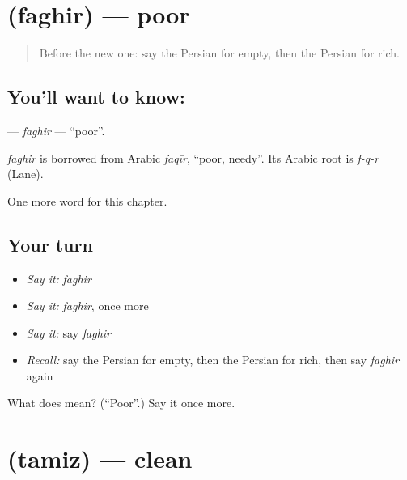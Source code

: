 \section[\texorpdfstring{\fa{فقیر} (faghir)}{فقیر (faghir)}]{ (faghir) — poor}

\label{lesson:FA-C61-faghir}



\begin{quote}
Before the new one: say the Persian for empty, then the Persian for rich.
\end{quote}

\subsection*{You'll want to know: }
\textbf{} — \emph{faghir} — \textquotedblleft{}poor\textquotedblright{}.

\begin{cousinweb}
\emph{faghir} is borrowed from Arabic \emph{faqīr}, \textquotedblleft{}poor, needy\textquotedblright{}. Its Arabic root is \emph{f-q-r} (Lane).
\end{cousinweb}

\begin{grammarlens}[title={What you've built}]
One more word for this chapter.
\end{grammarlens}

\subsection*{Your turn}
\begin{itemize}
\raggedright
  \item \emph{Say it:} \emph{faghir}
  \item \emph{Say it:} \emph{faghir}, once more
  \item \emph{Say it:} say \emph{faghir}
  \item \emph{Recall:} say the Persian for empty, then the Persian for rich, then say \emph{faghir} again
\end{itemize}

\begin{tcolorbox}[breakable,colback=teal!4,colframe=teal!35!black,title={Before you move on}]
What does  mean? (\textquotedblleft{}Poor\textquotedblright{}.) Say it once more.
\end{tcolorbox}
\section[\texorpdfstring{\fa{تمیز} (tamiz)}{تمیز (tamiz)}]{ (tamiz) — clean}

